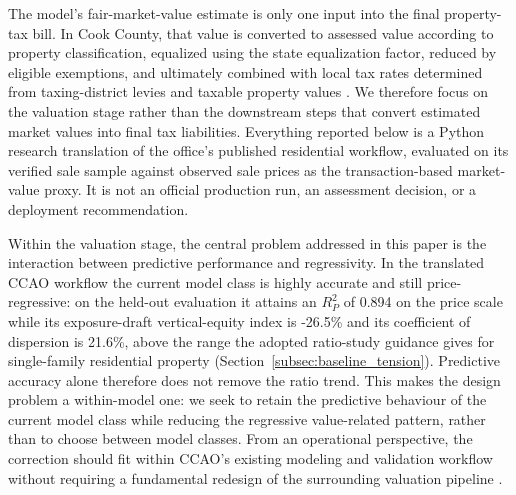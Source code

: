 \documentclass[10pt]{article}
\theoremstyle{definition}
\newcommand{\1}{\mathbf{1}}
\begin{document}
{The model's fair-market-value estimate is only one input into the final property-tax bill. In Cook County, that value is converted to assessed value according to property classification, equalized using the state equalization factor, reduced by eligible exemptions, and ultimately combined with local tax rates determined from taxing-district levies and taxable property values \cite{CCAOAssessmentNotice2026,CCAOPropertyTaxSystem2026}. We therefore focus on the valuation stage rather than the downstream steps that convert estimated market values into final tax liabilities.} Everything reported below is a Python research translation of the office's published residential workflow, evaluated on its verified sale sample against observed sale prices as the transaction-based market-value proxy. It is not an official production run, an assessment decision, or a deployment recommendation.


{Within the valuation stage, the central problem addressed in this paper is the interaction between predictive performance and regressivity. In the translated CCAO workflow the current model class is highly accurate and still price-regressive: on the held-out evaluation it attains an $R^2_P$ of 0.894 on the price scale while its exposure-draft vertical-equity index is -26.5\% and its coefficient of dispersion is 21.6\%, above the range the adopted ratio-study guidance gives for single-family residential property (Section~\ref{subsec:baseline_tension}). Predictive accuracy alone therefore does not remove the ratio trend. This makes the design problem a within-model one: we seek to retain the predictive behaviour of the current model class while reducing the regressive value-related pattern, rather than to choose between model classes. From an operational perspective, the correction should fit within CCAO's existing modeling and validation workflow without requiring a fundamental redesign of the surrounding valuation pipeline \cite{CCAOModelResAVM2026}.}
\end{document}
